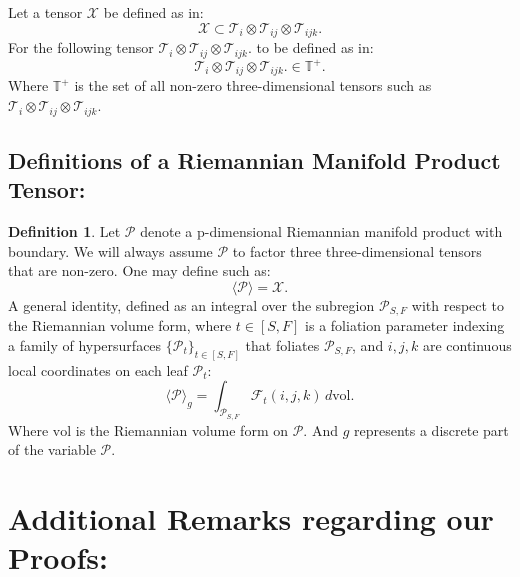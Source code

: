 \documentclass[10pt]{article}
\theoremstyle{plain}
\theoremstyle{definition}
\newtheorem{definition}[theorem]{Definition}
\theoremstyle{remark}
\begin{document}
Let a tensor $\mathcal{X}$ be defined as in:
\begin{equation}
  \mathcal{X} \subset \mathcal{T}_i \otimes \mathcal{T}_{ij} \otimes \mathcal{T}_{ijk}.
\end{equation}
For the following tensor $\mathcal{T}_i \otimes \mathcal{T}_{ij} \otimes \mathcal{T}_{ijk}.$ to be defined as in:
\begin{equation}
  \mathcal{T}_i \otimes \mathcal{T}_{ij} \otimes \mathcal{T}_{ijk}. \in \mathbb{T}^{+}.
\end{equation}
Where $\mathbb{T}^{+}$ is the set of all non-zero three-dimensional tensors such as $\mathcal{T}_i \otimes \mathcal{T}_{ij} \otimes \mathcal{T}_{ijk}.$

\subsection{Definitions of a Riemannian Manifold Product Tensor:}

\begin{definition}
\label{def:two-one}
    Let $\mathcal{P}$ denote a p-dimensional Riemannian manifold product with boundary. We will always assume $\mathcal{P}$ to factor three three-dimensional tensors that are non-zero. One may define such as:
    \begin{equation}
      \langle \mathcal{P} \rangle = \mathcal{X}.
    \end{equation}
    A general identity, defined as an integral over the subregion $\mathcal{P}_{S,F}$ with respect to the Riemannian volume form, where $t \in [S, F]$ is a foliation parameter indexing a family of hypersurfaces $\{\mathcal{P}_t\}_{t \in [S,F]}$ that foliates $\mathcal{P}_{S,F}$, and $i, j, k$ are continuous local coordinates on each leaf $\mathcal{P}_t$:
    \begin{equation}
      \langle \mathcal{P} \rangle_{g} = \int_{\mathcal{P}_{S,F}} \mathcal{F}_{t}(i, j, k) \, d\mathrm{vol}.
    \end{equation}
    Where $\mathrm{vol}$ is the Riemannian volume form on $\mathcal{P}$. And $g$ represents a discrete part of the variable $\mathcal{P}$. 
\end{definition}

\section{Additional Remarks regarding our Proofs:}
\end{document}
